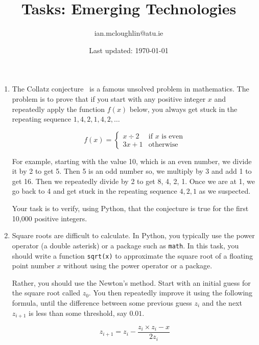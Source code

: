 \documentclass{iansnotes}
\title{Tasks: Emerging Technologies}
\author{ian.mcloughlin@atu.ie}
\date{Last updated: \today}
\begin{document}
 
\maketitle
 
\begin{enumerate}
  \item The Collatz conjecture~\autocite{quantacollatz} is a famous unsolved problem in mathematics. The problem is to prove that if you start with any positive integer $x$ and repeatedly apply the function $f(x)$ below, you always get stuck in the repeating sequence $1,4,2,1,4,2,\ldots$ 
  
  $$ f(x) = \begin{cases}
    x \div 2 & \text{if } x \text{ is even} \\
    3x + 1              & \text{otherwise} 
  \end{cases}$$

  For example, starting with the value 10, which is an even number, we divide it by 2 to get 5.
  Then 5 is an odd number so, we multiply by 3 and add 1 to get 16.
  Then we repeatedly divide by 2 to get 8, 4, 2, 1.
  Once we are at 1, we go back to 4 and get stuck in the repeating sequence $4, 2, 1$ as we suspected.

  Your task is to verify, using Python, that the conjecture is true for the first 10,000 positive integers.
  
  \item Square roots are difficult to calculate. In Python, you typically use the power operator (a double asterisk) or a package such as \texttt{math}. In this task\autocite{golangnewton}, you should write a function \texttt{sqrt(x)} to approximate the square root of a floating point number $x$ without using the power operator or a package.
  
  Rather, you should use the Newton's method\autocite{newtonsqrt}. Start with an initial guess for the square root called $z_0$. You then repeatedly improve it using the following formula, until the difference between some previous guess $z_i$ and the next $z_{i+1}$ is less than some threshold, say $0.01$.
  
  $$ z_{i+1} = z_i -  \frac{z_i \times z_i - x}{2 z_i}$$

\end{enumerate}
\end{document}
